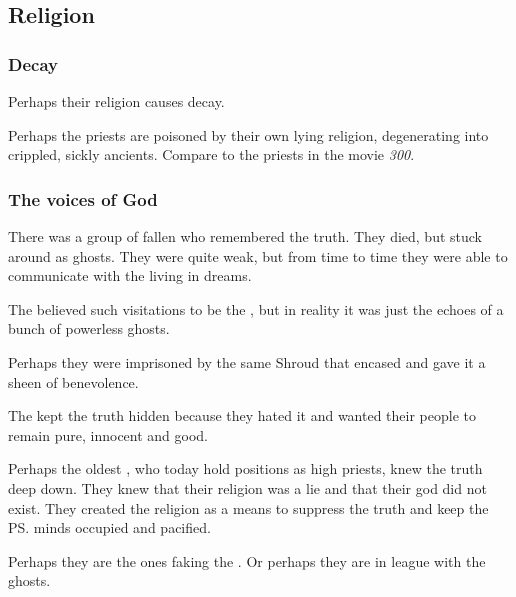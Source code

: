 \subsection{Religion}
\subsubsection{Decay}
Perhaps their religion causes decay. 


Perhaps the \Merkyran{} priests are poisoned by their own lying religion, degenerating into crippled, sickly ancients. 
Compare to the priests in the movie \emph{300}. 





\subsubsection{The voices of God}
There was a group of fallen \resphain{} who remembered the truth. 
They died, but stuck around as ghosts. 
They were quite weak, but from time to time they were able to communicate with the living \resphain{} in dreams. 

The \Merkyrans{} believed such visitations to be the , but in reality it was just the echoes of a bunch of powerless ghosts. 

Perhaps they were imprisoned by the same Shroud that encased \iquin{} and gave it a sheen of benevolence. 

The  kept the truth hidden because they hated it and wanted their people to remain pure, innocent and good. 

Perhaps the oldest \resphain, who today hold positions as high priests, knew the truth deep down. 
They knew that their religion was a lie and that their god did not exist. 
They created the religion as a means to suppress the truth and keep the \ps{\resphain}{} minds occupied and pacified. 

Perhaps they are the ones faking the . 
Or perhaps they are in league with the ghosts. 

